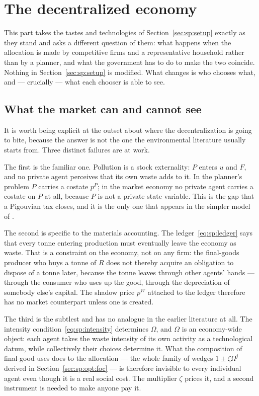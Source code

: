 \section{The decentralized economy}\label{sec:mkt:setup}

This part takes the tastes and technologies of Section~\ref{sec:sp:setup} exactly as they stand and
asks a different question of them: what happens when the allocation is made by competitive firms and
a representative household rather than by a planner, and what the government has to do to make the
two coincide. Nothing in Section~\ref{sec:sp:setup} is modified. What changes is who chooses what,
and --- crucially --- what each chooser is able to see.

\subsection{What the market can and cannot see}\label{sec:mkt:setup:externalities}

It is worth being explicit at the outset about where the decentralization is going to bite, because
the answer is not the one the environmental literature usually starts from. Three distinct failures
are at work.

The first is the familiar one. Pollution is a stock externality: $P$ enters $u$ and $F$, and no
private agent perceives that its own waste adds to it. In the planner's problem $P$ carries a costate
$p^P$; in the market economy no private agent carries a costate on $P$ at all, because $P$ is not a
private state variable. This is the gap that a Pigouvian tax closes, and it is the only one that
appears in the simpler model of \textcite{sorensen2018}.

The second is specific to the materials accounting. The ledger~\eqref{eq:sp:ledger} says that every
tonne entering production must eventually leave the economy as waste. That is a constraint on the
economy, not on any firm: the final-goods producer who buys a tonne of $R$ does not thereby acquire an
obligation to dispose of a tonne later, because the tonne leaves through other agents' hands ---
through the consumer who uses up the good, through the depreciation of somebody else's capital. The
shadow price $p^W$ attached to the ledger therefore has no market counterpart unless one is created.

The third is the subtlest and has no analogue in the earlier literature at all. The intensity
condition~\eqref{eq:sp:intensity} determines $\Omega$, and $\Omega$ is an economy-wide object: each
agent takes the waste intensity of its own activity as a technological datum, while collectively
their choices determine it. What the composition of final-good uses does to the allocation --- the
whole family of wedges $1\pm\zeta\Omega^j$ derived in Section~\ref{sec:sp:opt:foc} --- is therefore
invisible to every individual agent even though it is a real social cost. The multiplier $\zeta$
prices it, and a second instrument is needed to make anyone pay it.

